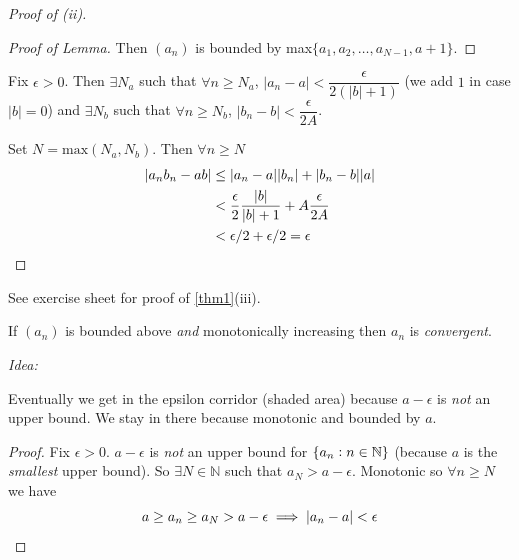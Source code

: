 \documentclass[twoside]{scrartcl}
\begin{document}
\begin{proof}[Proof of (ii)]
\begin{proof}[Proof of Lemma]
Then $(a_n)$ is bounded by max$\{a_1,a_2,\dots,a_{N-1},a+1\}$.
\end{proof}


Fix $\epsilon >0$. Then $\exists N_a$ such that $\forall n \geq N_a$, $|a_n - a| < \dfrac{\epsilon}{2(|b| + 1)}$ (we add $1$ in case $|b| = 0$)
and $\exists N_b$ such that $\forall n \geq N_b$, $|b_n - b| < \dfrac{\epsilon}{2A}$. 

Set $N = \text{max}(N_a,N_b)$. Then $\forall n \geq N$
\[\begin{aligned}|a_nb_n -ab| &\leq |a_n-a||b_n| + |b_n-b||a|\\ 
&< \frac{\epsilon}{2}\frac{|b|}{|b|+1} + A\frac{\epsilon}{2A}\\ 
& < \epsilon/2 + \epsilon/2 = \epsilon\qedhere	
\end{aligned}
\]
\end{proof}

See exercise sheet for proof of \ref{thm1}(iii).\\

\begin{theorem}
If $(a_n)$ is bounded above \emph{and} monotonically increasing then $a_n$ is \emph{convergent}.
\end{theorem}

\emph{Idea:} 
\begin{center}
\end{center}
Eventually we get in the epsilon corridor (shaded area) because $a-\epsilon$ is \emph{not} an upper bound. We stay in there because monotonic and bounded by $a$.
\begin{proof}
Fix $\epsilon >0$. $a-\epsilon$ is \emph{not} an upper bound for $\{a_n : n \in\mathbb{N}\}$ (because $a$ is the \emph{smallest} upper bound). So $\exists N \in \mathbb{N}$ such that $a_N > a-\epsilon$. Monotonic so $\forall n \geq N$ we have \[a\geq a_n\geq a_N > a-\epsilon \implies |a_n - a| < \epsilon\qedhere\]	
\end{proof}~
\end{document}
